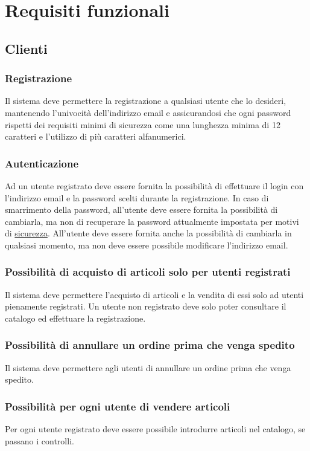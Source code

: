 \documentclass[12pt,a4paper]{article}
\begin{document}
\newpage
\section{Requisiti funzionali}
\subsection{Clienti}
\subsubsection{Registrazione}
Il sistema deve permettere la registrazione a qualsiasi utente che lo desideri, mantenendo l'univocità dell'indirizzo email e assicurandosi che ogni password rispetti dei requisiti minimi di sicurezza come una lunghezza minima di 12 caratteri e l'utilizzo di più caratteri alfanumerici.

\subsubsection{Autenticazione}
Ad un utente registrato deve essere fornita la possibilità di effettuare il login con l'indirizzo email e la password scelti durante la registrazione. In caso di smarrimento della password, all'utente deve essere fornita la possibilità di cambiarla, ma non di recuperare la password attualmente impostata per motivi di  \hyperref[sec:security]{sicurezza}. All'utente deve essere fornita anche la possibilità di cambiarla in qualsiasi momento, ma non deve essere possibile modificare l'indirizzo email.

\subsubsection{Possibilità di acquisto di articoli solo per utenti registrati}
Il sistema deve permettere l'acquisto di articoli e la vendita di essi solo ad utenti pienamente registrati. Un utente non registrato deve solo poter consultare il catalogo ed effettuare la registrazione.

\subsubsection{Possibilità di annullare un ordine prima che venga spedito}
Il sistema deve permettere agli utenti di annullare un ordine prima che venga spedito.

\subsubsection{Possibilità per ogni utente di vendere articoli}
Per ogni utente registrato deve essere possibile introdurre articoli nel catalogo, se passano i controlli.
\end{document}
